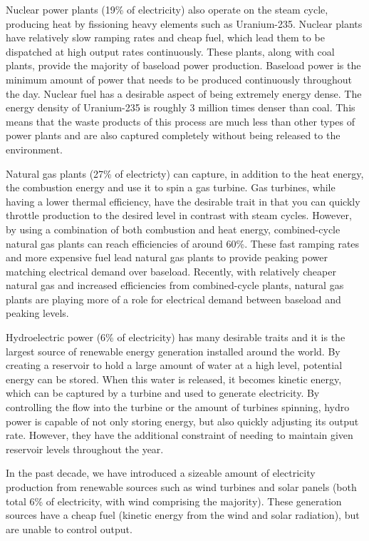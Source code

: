 	Nuclear power plants (19\% of electricity) also operate on the steam cycle, producing heat by fissioning heavy elements such as Uranium-235.  Nuclear plants have relatively slow ramping rates and cheap fuel, which lead them to be dispatched at high output rates continuously.  These plants, along with coal plants, provide the majority of baseload power production. Baseload power is the minimum amount of power that needs to be produced continuously throughout the day.  Nuclear fuel has a desirable aspect of being extremely energy dense.  The energy density of Uranium-235 is roughly 3 million times denser than coal.  This means that the waste products of this process are much less than other types of power plants and are also captured completely without being released to the environment.

	Natural gas plants (27\% of electricty) can capture, in addition to the heat energy, the combustion energy and use it to spin a gas turbine.  Gas turbines, while having a lower thermal efficiency, have the desirable trait in that you can quickly throttle production to the desired level in contrast with steam cycles.  However, by using a combination of both combustion and heat energy, combined-cycle natural gas plants can reach efficiencies of around 60\%.  These fast ramping rates and more expensive fuel lead natural gas plants to provide peaking power matching electrical demand over baseload.  Recently, with relatively cheaper natural gas and increased efficiencies from combined-cycle plants, natural gas plants are playing more of a role for electrical demand between baseload and peaking levels.    

	Hydroelectric power (6\% of electricity) has many desirable traits and it is the largest source of renewable energy generation installed around the world.  By creating a reservoir to hold a large amount of water at a high level, potential energy can be stored.  When this water is released, it becomes kinetic energy, which can be captured by a turbine and used to generate electricity.  By controlling the flow into the turbine or the amount of turbines spinning, hydro power is capable of not only storing energy, but also quickly adjusting its output rate.  However, they have the additional constraint of needing to maintain given reservoir levels throughout the year.

	In the past decade, we have introduced a sizeable amount of electricity production from renewable sources such as wind turbines and solar panels (both total 6\% of electricity, with wind comprising the majority).  These generation sources have a cheap fuel (kinetic energy from the wind and solar radiation), but are unable to control output.  

